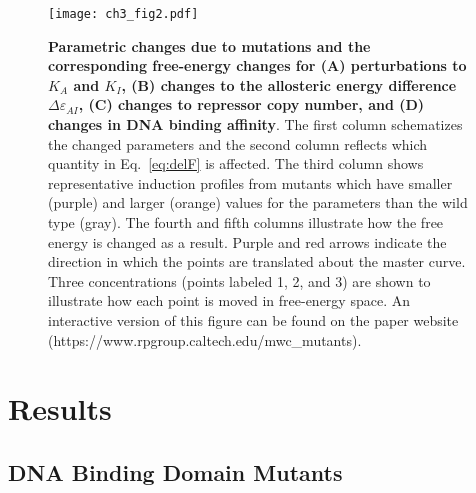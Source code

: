 \documentclass[12pt]{caltech_thesis}
\begin{document}
\hypertarget{fig:deltaF_theory}{%
\begin{figure}
\centering
\texttt{[image: ch3\_fig2.pdf]}
\caption[{Parametric changes due to mutations and their corresponding
free-energy shifts.}]{\textbf{Parametric changes due to mutations and
the corresponding free-energy changes for (A) perturbations to \(K_A\)
and \(K_I\), (B) changes to the allosteric energy difference
\(\Delta\varepsilon_{AI}\), (C) changes to repressor copy number, and
(D) changes in DNA binding affinity}. The first column schematizes the
changed parameters and the second column reflects which quantity in
Eq.~\ref{eq:delF} is affected. The third column shows representative
induction profiles from mutants which have smaller (purple) and larger
(orange) values for the parameters than the wild type (gray). The fourth
and fifth columns illustrate how the free energy is changed as a result.
Purple and red arrows indicate the direction in which the points are
translated about the master curve. Three concentrations (points labeled
1, 2, and 3) are shown to illustrate how each point is moved in
free-energy space. An interactive version of this figure can be found on
the paper website (https://www.rpgroup.caltech.edu/mwc\_mutants).}
\label{fig:deltaF_theory}
\end{figure}
}

\hypertarget{results-1}{%
\section{Results}\label{results-1}}

\hypertarget{dna-binding-domain-mutants}{%
\subsection{DNA Binding Domain
Mutants}\label{dna-binding-domain-mutants}}
\end{document}
